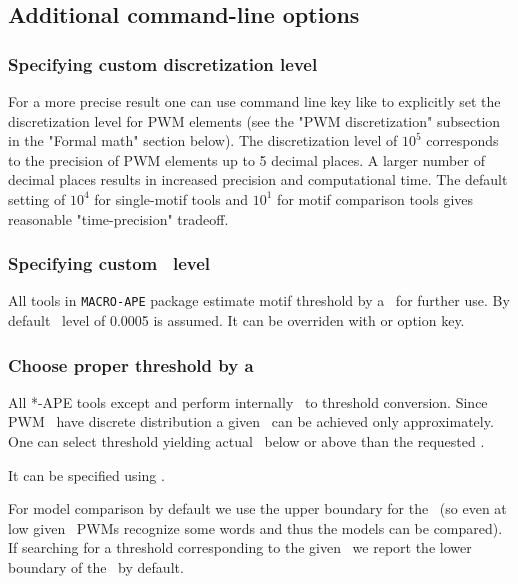 \subsection{Additional command-line options}

\subsubsection{Specifying custom discretization level}
For a more precise result one can use  command line key like  to explicitly set
the discretization level for PWM elements (see the "PWM discretization" subsection in the "Formal math" section below).
The discretization level of $10^5$ corresponds to the precision of PWM elements up to 5 decimal places.
A larger number of decimal places results in increased precision and computational time.
The default setting of $10^4$ for single-motif tools and $10^1$ for motif comparison tools gives reasonable "time-precision" tradeoff.

\subsubsection{Specifying custom \pvalue\ level}
All tools in \texttt{MACRO-APE} package estimate motif threshold by a \pvalue\ for further use. By default \pvalue\ level of 0.0005 is assumed. It can be overriden with  or  option key.

\subsubsection{Choose proper threshold by a \pvalue}
All *-APE tools except  and  perform internally \pvalue\ to threshold conversion. Since PWM \pvalues\ have discrete distribution a given \pvalue\ can be achieved only approximately. One can select threshold yielding actual \pvalue\ below or above than 
the requested \pvalue. 

It can be specified using .

For model comparison by default we use the upper boundary for the \pvalue~(so even at low given \pvalues\ PWMs recognize some words and thus the models can be 
compared). If searching for a threshold corresponding to the given \pvalue\ we report the lower boundary of the \pvalue\ by default.


